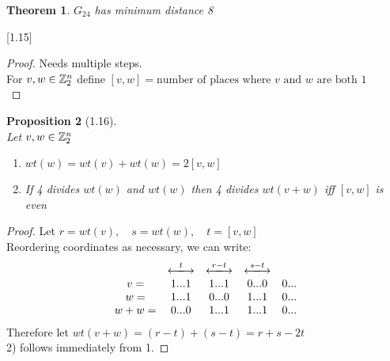 \documentclass[]{amsart}
\newtheorem{thm}{Theorem}[section]
\newtheorem{prop}[thm]{Proposition}
\theoremstyle{definition}
\theoremstyle{remark}
\numberwithin{equation}{section}
\begin{document}
\begin{thm}
	$G_24$ has minimum distance 8\\
\end{thm}[1.15]
\begin{proof}
	Needs multiple steps. \\
	For $v,w \in \mathbb{Z}_2^n$ define $[v,w] = \text{number of places where $v$ and $w$ are both 1}$\\
\end{proof}
\begin{prop}[1.16]\hfill\\
	Let $v,w \in \mathbb{Z}_2^n$\\
	\begin{enumerate}
		\item $wt(w) = wt(v) + wt(w) = 2[v,w]$\\
		\item If 4 divides $wt(w)$ and $wt(w)$ then 4 divides $wt(v+w)$ iff $[v,w]$ is even\\
	\end{enumerate}
\end{prop}
\begin{proof}
	Let $r = wt(v),\quad s = wt(w),\quad t = [v,w]$\\
	Reordering coordinates as necessary, we can write:\\
	\[
		\begin{matrix}
			& \xlongleftrightarrow{t} & \xlongleftrightarrow{r-t} & \xlongleftrightarrow{s-t}\\
		v  =& 1 ... 1  				  &1 ... 1 					  &0 ...0		    & 0 ... \\
		w  =& 1 ... 1  				  &0 ... 0 					  &1 ...1		    & 0 ... \\
		w+w=& 0 ... 0  				  &1 ... 1 					  &1 ...1		    & 0 ... \\
		\end{matrix}
	\]
	Therefore let $wt(v+w) = (r-t) + (s-t) = r +s - 2t$\\
	2) follows immediately from 1.
\end{proof}
\end{document}

